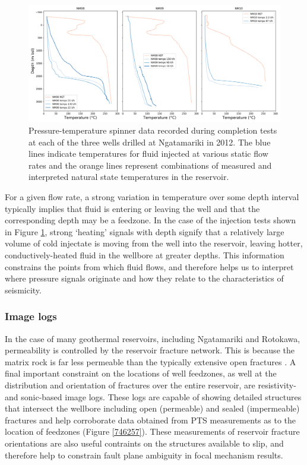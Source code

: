 \begin{figure}
\begin{center}
\includegraphics[width=\textwidth,height=\textheight,keepaspectratio]{Chapter_2_Data/figures/all_wells_Nga/all_wells_Nga_original}
\caption{{Pressure-temperature spinner data recorded during completion tests at
each of the three wells drilled at Ngatamariki in 2012. The blue lines
indicate temperatures for fluid injected at various static flow rates
and the orange lines represent combinations of measured and interpreted
natural state temperatures in the reservoir.
{\label{748181}}%
}}
\end{center}
\end{figure}

For a given flow rate, a strong variation in temperature over some depth interval typically implies that fluid is entering or leaving the well and that the corresponding depth may be a feedzone. In the case of the injection tests shown in Figure \ref{748181}, strong `heating' signals with depth signify that a relatively large volume of cold injectate is moving from the well into the reservoir, leaving hotter, conductively-heated fluid in the wellbore at greater depths. This information constrains the points from which fluid flows, and therefore helps us to interpret where pressure signals originate and how they relate to the characteristics of seismicity.

\subsubsection{Image logs}
In the case of many geothermal reservoirs, including Ngatamariki and Rotokawa, permeability is controlled by the reservoir fracture network. This is because the matrix rock is far less permeable than the typically extensive open fractures \citep{Grant_2011,Cant_2018}. A final important constraint on the locations of well feedzones, as well at the distribution and orientation of fractures over the entire reservoir, are resistivity- and sonic-based image logs. These logs are capable of showing detailed structures that intersect the wellbore including open (permeable) and sealed (impermeable) fractures and help corroborate data obtained from PTS measurements as to the location of feedzones (Figure \ref{746257}). These measurements of reservoir fracture orientations are also useful contraints on the structures available to slip, and therefore help to constrain fault plane ambiguity in focal mechanism results.

